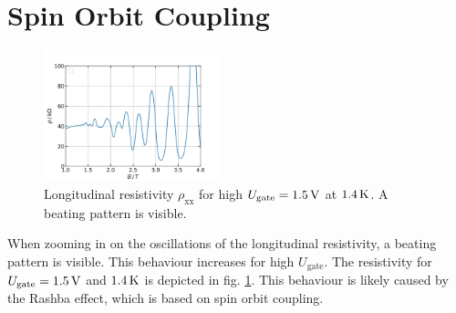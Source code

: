 \section{Spin Orbit Coupling}
\begin{figure}[h]
    \centering
    \includegraphics[width=0.45\textwidth]{../Images/beatingPattern.png}
    \caption{Longitudinal resistivity $\rho_\text{xx}$ for high $U_\text{gate} = 1.5 \,\text V$ at $1.4 \,\text K$.
    A beating pattern is visible.
    }
    \label{fig:beatingPattern}
\end{figure}
When zooming in on the oscillations of the longitudinal resistivity, 
a beating pattern is visible.
This behaviour increases for high $U_\text{gate}$.
The resistivity for $U_\text{gate} = 1.5 \,\text V$ and $1.4 \,\text K$ is depicted in fig. \ref{fig:beatingPattern}.
This behaviour is likely caused by the Rashba effect, which is based on spin orbit coupling.
